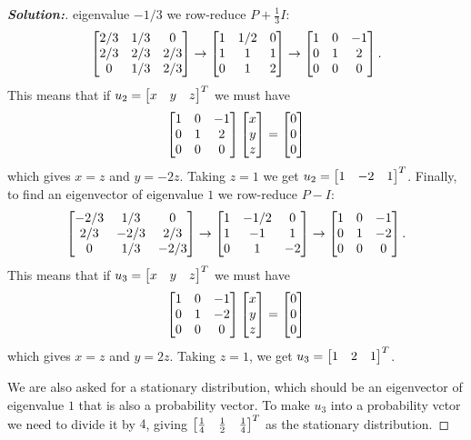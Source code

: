 \documentclass[a4paper]{amsart}
\theoremstyle{definition}
\newenvironment{solution}{\begin{proof}[\textbf{Solution:}] \vphantom{u}}{\end{proof}}
\begin{document}
\begin{solution}
 eigenvalue $-1/3$ we row-reduce $P+\frac{1}{3}I$:
 \[ \left[\begin{matrix} 2/3 & 1/3 & 0 \\ 2/3 & 2/3 & 2/3 \\ 0 & 1/3 & 2/3 \end{matrix}\right] 
    \to 
    \left[\begin{matrix} 1 & 1/2 & 0 \\ 1 & 1 & 1 \\ 0 & 1 & 2 \end{matrix}\right]
    \to
    \left[\begin{matrix} 1 & 0 & -1 \\ 0 & 1 & 2 \\ 0 & 0 & 0 \end{matrix}\right].
 \]
 This means that if $u_2=\left[\begin{matrix} x&y&z\end{matrix}\right]^T$ we must have
 \[ \left[\begin{matrix} 1 & 0 & -1 \\ 0 & 1 & 2 \\ 0 & 0 & 0 \end{matrix}\right]
     \left[\begin{matrix} x \\ y \\ z\end{matrix}\right] = \left[\begin{matrix} 0 \\ 0 \\ 0 \end{matrix}\right] 
 \]
 which gives $x=z$ and $y=-2z$.  Taking $z=1$ we get
 $u_2=\left[\begin{matrix} 1&-2&1\end{matrix}\right]^T$.  Finally, to find an eigenvector of
 eigenvalue $1$ we row-reduce $P-I$:
 \[ \left[\begin{matrix} -2/3 & 1/3 & 0 \\ 2/3 & -2/3 & 2/3 \\ 0 & 1/3 & -2/3 \end{matrix}\right] 
    \to 
    \left[\begin{matrix} 1 & -1/2 & 0 \\ 1 & -1 & 1 \\ 0 & 1 & -2 \end{matrix}\right]
    \to
    \left[\begin{matrix} 1 & 0 & -1 \\ 0 & 1 & -2 \\ 0 & 0 & 0 \end{matrix}\right].
 \]
 This means that if $u_3=\left[\begin{matrix} x&y&z\end{matrix}\right]^T$ we must have
 \[ \left[\begin{matrix} 1 & 0 & -1 \\ 0 & 1 & -2 \\ 0 & 0 & 0 \end{matrix}\right]
     \left[\begin{matrix} x \\ y \\ z\end{matrix}\right] = \left[\begin{matrix} 0 \\ 0 \\ 0 \end{matrix}\right] 
 \]
 which gives $x=z$ and $y=2z$.  Taking $z=1$, we get
 $u_3=\left[\begin{matrix} 1&2&1\end{matrix}\right]^T$.  

 We are also asked for a stationary distribution, which should be an
 eigenvector of eigenvalue $1$ that is also a probability vector.  To
 make $u_3$ into a probability vctor we need to divide it by $4$,
 giving $\left[\begin{matrix} \frac{1}{4}&\frac{1}{2}&\frac{1}{4}\end{matrix}\right]^T$ as the
 stationary distribution.
\end{solution}
\end{document}
